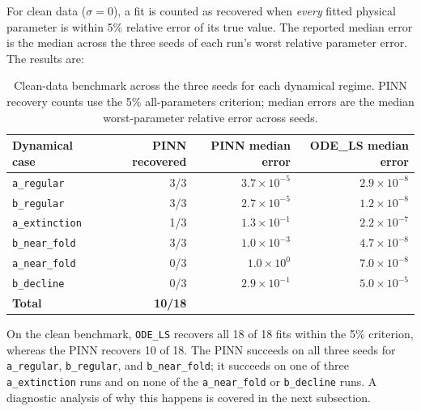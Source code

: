 For clean data ($\sigma=0$), a fit is counted as recovered when
\emph{every} fitted physical parameter is within 5\% relative error of its
true value. The reported median error is the median across the three seeds
of each run's worst relative parameter error. The results are:
\begin{table}[ht]
\centering
\caption{Clean-data benchmark across the three seeds for each dynamical
regime. PINN recovery counts use the 5\% all-parameters criterion; median
errors are the median worst-parameter relative error across seeds.}
\label{tab:wp05_clean_benchmark}
\small
\begin{tabular}{lrrr}
\toprule
\textbf{Dynamical case} & \textbf{PINN recovered} & \textbf{PINN median error} & \textbf{ODE\_LS median error}\\
\midrule
\texttt{a\_regular}    & 3/3 & $3.7\times10^{-5}$ & $2.9\times10^{-8}$\\
\texttt{b\_regular}    & 3/3 & $2.7\times10^{-5}$ & $1.2\times10^{-8}$\\
\texttt{a\_extinction} & 1/3 & $1.3\times10^{-1}$ & $2.2\times10^{-7}$\\
\texttt{b\_near\_fold} & 3/3 & $1.0\times10^{-3}$ & $4.7\times10^{-8}$\\
\texttt{a\_near\_fold} & 0/3 & $1.0\times10^{0}$  & $7.0\times10^{-8}$\\
\texttt{b\_decline}    & 0/3 & $2.9\times10^{-1}$ & $5.0\times10^{-5}$\\
\midrule
\textbf{Total} & \textbf{10/18} & & \\
\bottomrule
\end{tabular}
\end{table}

On the clean benchmark, \texttt{ODE\_LS} recovers all 18 of 18 fits within
the 5\% criterion, whereas the PINN recovers 10 of 18. The PINN succeeds
on all three seeds for \texttt{a\_regular}, \texttt{b\_regular}, and
\texttt{b\_near\_fold}; it succeeds on one of three
\texttt{a\_extinction} runs and on none of the
\texttt{a\_near\_fold} or \texttt{b\_decline} runs. A diagnostic analysis of why this happens is covered in the next subsection.

